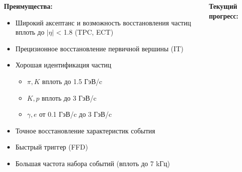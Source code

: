 \documentclass[dvipsnames] {beamer}
\begin{document}
\begin{frame}
\begin{columns}[t]
                  {\tiny
                    \vskip -0.5cm
                    \begin{block}{\bf \centering \footnotesize Преимущества:}
                      \begin{itemize}
                      \item Широкий аксептанс и возможность восстановления частиц вплоть до $|\eta|$ < 1.8 (TPC, ECT)
                      \item Прецизионное восстановление первичной вершины (IT)
                      \item Хорошая идентификация частиц
                        \begin{itemize}
                        \item  {\tiny$\pi, K$ вплоть до 1.5 ГэВ/c}
                        \item {\tiny$K, p$ вплоть до 3 ГэВ/c}
                        \item {\tiny$\gamma, e$ от 0.1 ГэВ/c до 3 ГэВ/c}
                        \end{itemize}
                      \item Точное восстановление характеристик события
                      \item Быстрый триггер (FFD)
                      \item Большая частота набора событий (вплоть до 7 kГц) 
                      \end{itemize}
                    \end{block}
                  }
                  \vskip -0.3cm
                  \begin{block}{\bf \centering \footnotesize Текущий прогресс:}

\end{block}
\end{columns}
\end{frame}
\end{document}
